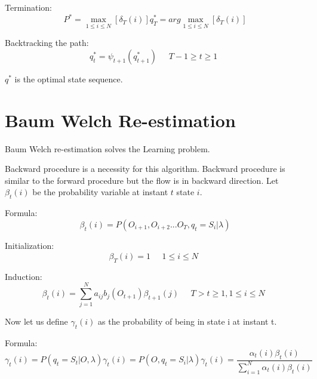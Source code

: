Termination:
\begin{equation*}
    P^* = \max_{1\leq i \leq N}[\delta_T(i)]
    q_T^* = arg\max_{1\leq i \leq N}[\delta_T(i)]
\end{equation*}

Backtracking the path:
\begin{equation*}
    q_t^* = \psi_{t+1}(q_{t+1}^*)
\quad \begin{aligned} T-1 \geq t \geq 1 \end{aligned}
\end{equation*}

$q^*$ is the optimal state sequence.

\section{Baum Welch Re-estimation}
Baum Welch re-estimation solves the Learning problem.

Backward procedure is a necessity for this algorithm. Backward procedure is similar to the forward procedure but the flow is in backward direction. Let $\beta_t(i)$ be the probability variable at instant $t$ state $i$.

Formula:
\begin{equation*}
    \beta_t(i) = P(O_{i+1}, O_{i+2}...O_T, q_t = S_i | \lambda)
\end{equation*}

Initialization:
\begin{equation*}
    \beta_T(i) = 1
    \quad \begin{aligned} 1 \leq i \leq N \end{aligned}
\end{equation*}

Induction:
\begin{equation*}
    \beta_t(i) = \sum_{j=1}^N a_{ij} b_j(O_{t+1}) \beta_{t+1}(j)
    \quad \begin{aligned} T > t \geq 1, 1 \leq i \leq N \end{aligned}
\end{equation*}

Now let us define $\gamma_t(i)$ as the probability of being in state i at instant t.

Formula:
\begin{equation*}
    \gamma_t(i) = P(q_t = S_t | O, \lambda)
    \gamma_t(i) = P(O, q_t = S_i | \lambda)
    \gamma_t(i) = \frac{\alpha_t(i) \beta_t(i)}{\sum_{i=1}^N\alpha_t(i) \beta_t(i)} 
\end{equation*}

